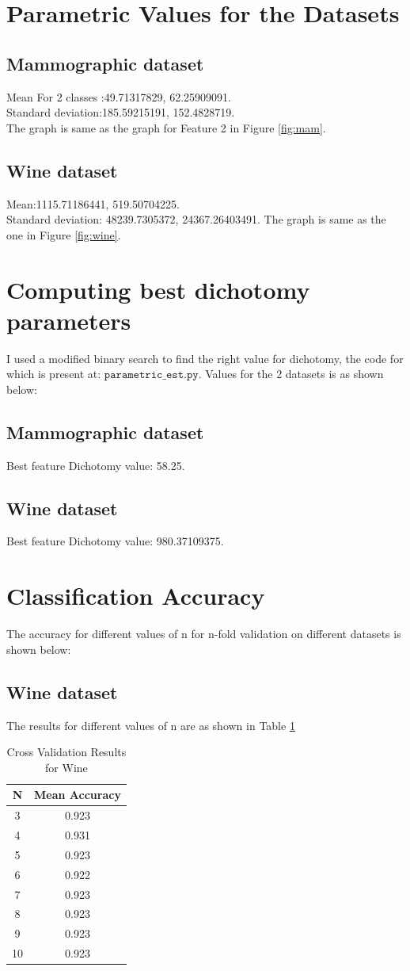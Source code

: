 \documentclass[11pt, pdftex]{article}
\begin{document}
\section{Parametric Values for the Datasets}
\subsection{Mammographic dataset}
Mean For 2 classes :49.71317829, 62.25909091. \\
Standard deviation:185.59215191, 152.4828719. \\
The graph is same as the graph for Feature 2 in Figure \ref{fig:mam}.
\subsection{Wine dataset}
Mean:1115.71186441, 519.50704225. \\
Standard deviation: 48239.7305372, 24367.26403491.
The graph is same as the one in Figure \ref{fig:wine}.
\section{Computing best dichotomy parameters}
I used a modified binary search to find the right value for dichotomy, the code for which is present at: $\texttt{parametric\_est.py}$. Values for the 2 datasets is as shown below:
\subsection{Mammographic dataset}
Best feature Dichotomy value: 58.25.\\
\subsection{Wine dataset}
Best feature Dichotomy value: 980.37109375.\\
\section{Classification Accuracy}
The accuracy for different values of n for n-fold validation on different datasets is shown below:
\subsection{Wine dataset}
The results for different values of n are as shown in Table \ref{tab:wine}
\begin{table}
\centering
\begin{tabular}{ | c | c |}
    \hline
    {\bf N} & {\bf Mean Accuracy} \\ 
    \hline
    3 & 0.923\\
	\hline
	4 & 0.931\\
	\hline
	5 & 0.923\\
	\hline
	6 & 0.922\\
	\hline
	7 & 0.923\\
	\hline
	8 & 0.923\\
	\hline
	9 & 0.923\\
	\hline
	10 & 0.923\\
	\hline
	\end{tabular}
	\caption{Cross Validation Results for Wine}
    \label{tab:wine}
\end{table}
\end{document}
